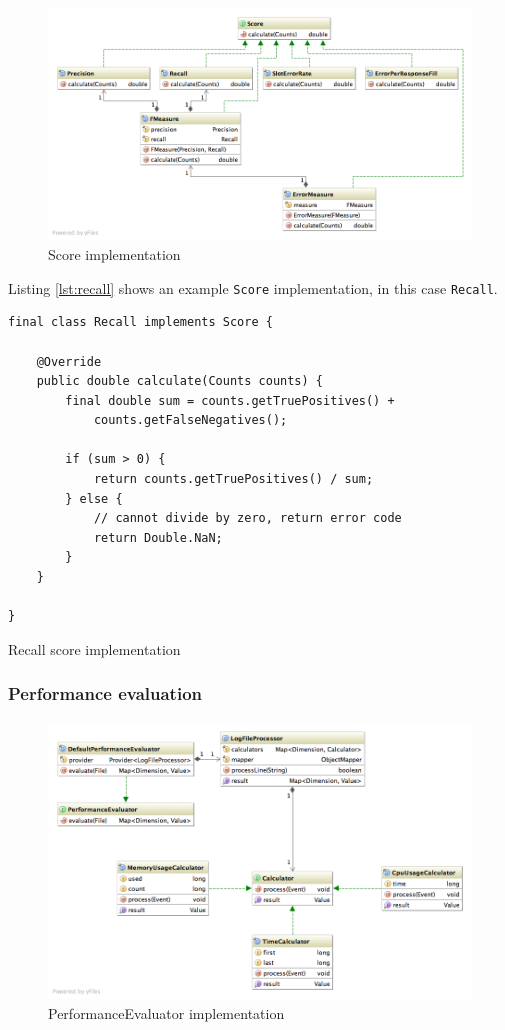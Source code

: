 \begin{figure}[H]
\centering
\includegraphics[width=\textwidth, trim=20px 20px 0 0, clip=true]{score.png}
\caption{Score implementation}
\end{figure}

Listing \ref{lst:recall} shows an example \texttt{Score} implementation, in this case \texttt{Recall}.

\begin{listing}[H]
\begin{verbatim}
final class Recall implements Score {

    @Override
    public double calculate(Counts counts) {
        final double sum = counts.getTruePositives() + 
            counts.getFalseNegatives();

        if (sum > 0) {
            return counts.getTruePositives() / sum;
        } else {
            // cannot divide by zero, return error code
            return Double.NaN;
        }
    }

}
\end{verbatim}
\caption{Recall score implementation}
\label{lst:recall}
\end{listing}

\newpage
\subsubsection{Performance evaluation}
\begin{figure}[H]
\centering
\includegraphics[width=\textwidth, trim=20px 20px 0 0, clip=true]{performance-evaluation.png}
\caption{PerformanceEvaluator implementation}
\end{figure}

